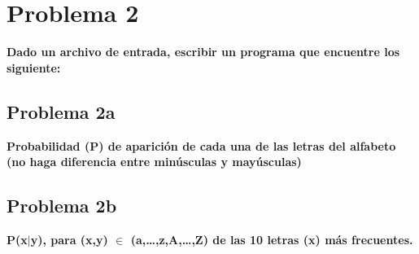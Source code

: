 \section*{Problema 2}

\textbf{Dado un archivo de entrada, escribir un programa que encuentre los siguiente:}

\subsection*{Problema 2a}

\textbf{Probabilidad (P) de aparición de cada una de las letras del alfabeto (no haga diferencia entre minúsculas y mayúsculas)}

\subsection*{Problema 2b}

\textbf{P(x$|$y), para (x,y) $\mathbb{\in}$ (a,…,z,A,…,Z) de las 10 letras (x) más frecuentes.}